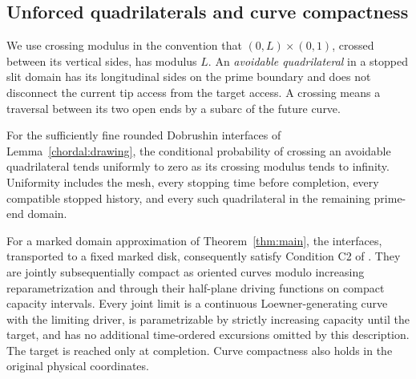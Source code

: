 \subsection{Unforced quadrilaterals and curve compactness}

We use crossing modulus in the convention that $(0,L)\times(0,1)$,
crossed between its vertical sides, has modulus $L$.
An \emph{avoidable quadrilateral} in a stopped slit domain has its
longitudinal sides on the prime boundary and does not disconnect
the current tip access from the target access.  A crossing means
a traversal between its two open ends by a subarc of the future curve.

\begin{theorem}\label{thm:c2}
For the sufficiently fine rounded Dobrushin interfaces of
Lemma~\ref{chordal:drawing}, the conditional probability of crossing
an avoidable quadrilateral tends uniformly to zero as its crossing
modulus tends to infinity.  Uniformity includes the mesh, every
stopping time before completion, every compatible stopped history,
and every such quadrilateral in the remaining prime-end domain.

For a marked domain approximation of Theorem~\ref{thm:main}, the
interfaces, transported to a fixed marked disk, consequently
satisfy Condition C2 of \cite{KemppainenSmirnov2017}.  They are
jointly subsequentially compact as oriented curves modulo increasing
reparametrization and through their half-plane driving functions
on compact capacity intervals.  Every joint limit is a continuous
Loewner-generating curve with the limiting driver, is parametrizable
by strictly increasing capacity until the target, and has no
additional time-ordered excursions omitted by this description.
The target is reached only at completion.  Curve compactness also
holds in the original physical coordinates.
\end{theorem}

